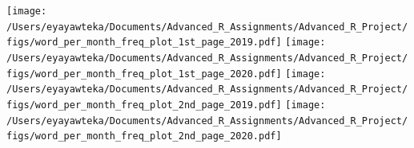 \documentclass[
  12pt,
]{article}
\begin{document}
\texttt{[image: /Users/eyayawteka/Documents/Advanced\_R\_Assignments/Advanced\_R\_Project/figs/word\_per\_month\_freq\_plot\_1st\_page\_2019.pdf]} \texttt{[image: /Users/eyayawteka/Documents/Advanced\_R\_Assignments/Advanced\_R\_Project/figs/word\_per\_month\_freq\_plot\_1st\_page\_2020.pdf]} \texttt{[image: /Users/eyayawteka/Documents/Advanced\_R\_Assignments/Advanced\_R\_Project/figs/word\_per\_month\_freq\_plot\_2nd\_page\_2019.pdf]} \texttt{[image: /Users/eyayawteka/Documents/Advanced\_R\_Assignments/Advanced\_R\_Project/figs/word\_per\_month\_freq\_plot\_2nd\_page\_2020.pdf]}
\end{document}
